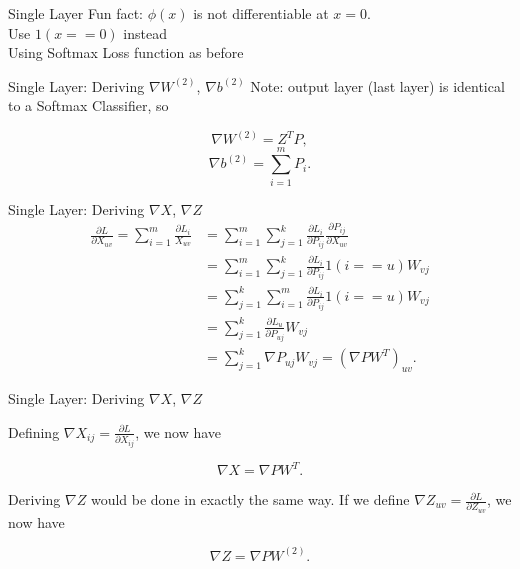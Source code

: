 \documentclass{beamer}
\begin{document}
  \begin{frame}{Single Layer}
  Fun fact: $\phi(x)$ is not differentiable at $x = 0$.\\
  Use $1(x == 0)$ instead\\
  Using Softmax Loss function as before
  \end{frame}

  \begin{frame}{Single Layer: Deriving $\nabla W^{(2)}$, $\nabla b^{(2)}$}
    Note: output layer (last layer) is identical to a Softmax Classifier, so

    $$ \nabla W^{(2)} = Z^T P, $$
    $$ \nabla b^{(2)} = \sum_{i=1}^m P_i. $$

  \end{frame}

  \begin{frame}{Single Layer: Deriving $\nabla X$, $\nabla Z$}
    \begin{align*}
      \frac{\partial L}{\partial X_{uv}} 
      =\sum_{i=1}^m \frac{\partial L_i}{X_{uv}}
      &= \sum_{i=1}^m \sum_{j=1}^k \frac{\partial L_i}{\partial P_{ij}}
          \frac{\partial P_{ij}}{\partial X_{uv}}\\
      &= \sum_{i=1}^m \sum_{j=1}^k \frac{\partial L_i}{\partial P_{ij}}
          1(i == u) W_{vj}\\
      &= \sum_{j=1}^k \sum_{i=1}^m \frac{\partial L_i}{\partial P_{ij}}
          1(i == u) W_{vj}\\
      &= \sum_{j=1}^k \frac{\partial L_u}{\partial P_{uj}} W_{vj}\\
      &= \sum_{j=1}^k \nabla P_{uj} W_{vj}
       = \left( \nabla P W^T \right) _{uv}.
    \end{align*}
  \end{frame}

    \begin{frame}{Single Layer: Deriving $\nabla X$, $\nabla Z$}
    
    Defining $\nabla X_{ij} = \frac{\partial L}{\partial X_{ij}}$, we now have
    
    $$ \nabla X = \nabla P W^T. $$
    
    Deriving $\nabla Z$ would be done in exactly the same way. If we define
    $\nabla Z_{uv} = \frac{\partial L}{\partial Z_{uv}}$, we now have
    
    $$ \nabla Z = \nabla P W^{(2)}. $$
      
  \end{frame}
\end{document}
